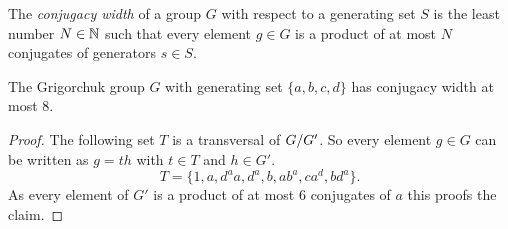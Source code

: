 \documentclass[a4paper,11pt]{amsart}
\begin{document}
\begin{defi}
 The \emph{conjugacy width} of a group $G$ with respect to a generating set $S$ 
 is the least number $N\in\mathbb{N}$ such that every element $g\in G$ is a product of
 at most $N$ conjugates of generators $s\in S$.
\end{defi}
\begin{cor}
 The Grigorchuk group $G$ with generating set $\{a,b,c,d\}$ has conjugacy width at most $8$.
\end{cor}
\begin{proof}
 The following set $T$ is a transversal of ${G/G'}$. So every element $g\in G$ can be written as $g=th$ with $t\in T$ and $h\in G'$.
 \[T=\{1,a,d^aa,d^a,b,ab^a,ca^d,bd^a\}.\]
 As every element of $G'$ is a product of at most $6$ conjugates of $a$ this proofs the claim.

\end{proof}

\end{document}
